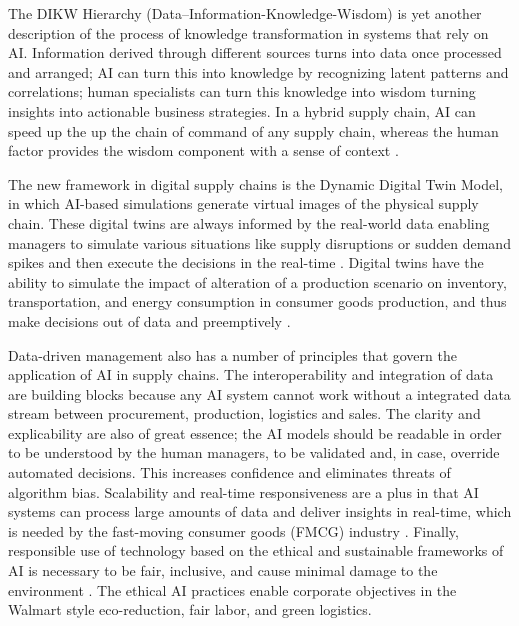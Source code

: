 The DIKW Hierarchy (Data–Information-Knowledge-Wisdom) is yet another description of the process of knowledge transformation in systems that rely on AI. Information derived through different sources turns into data once processed and arranged; AI can turn this into knowledge by recognizing latent patterns and correlations; human specialists can turn this knowledge into wisdom turning insights into actionable business strategies. In a hybrid supply chain, AI can speed up the up the chain of command of any supply chain, whereas the human factor provides the wisdom component with a sense of context \autocite{DEEPU2021200048}.

The new framework in digital supply chains is the Dynamic Digital Twin Model, in which AI-based simulations generate virtual images of the physical supply chain. These digital twins are always informed by the real-world data enabling managers to simulate various situations like supply disruptions or sudden demand spikes and then execute the decisions in the real-time \autocite{espinosa2024}. Digital twins have the ability to simulate the impact of alteration of a production scenario on inventory, transportation, and energy consumption in consumer goods production, and thus make decisions out of data and preemptively \autocite{barykin2020concept, abideen2021digital}.

Data-driven management also has a number of principles that govern the application of AI in supply chains. The interoperability and integration of data are building blocks because any AI system cannot work without a integrated data stream between procurement, production, logistics and sales. The clarity and explicability are also of great essence; the AI models should be readable in order to be understood by the human managers, to be validated and, in case, override automated decisions. This increases confidence and eliminates threats of algorithm bias. Scalability and real-time responsiveness are a plus in that AI systems can process large amounts of data and deliver insights in real-time, which is needed by the fast-moving consumer goods (FMCG) industry \autocite{ghodake2024enhancing}. Finally, responsible use of technology based on the ethical and sustainable frameworks of AI is necessary to be fair, inclusive, and cause minimal damage to the environment \autocite{paleti2025artificial}. The ethical AI practices enable corporate objectives in the Walmart style eco-reduction, fair labor, and green logistics.

